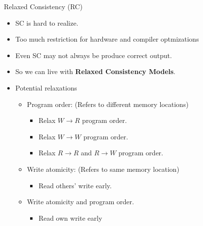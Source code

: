 \documentclass[9pt]{beamer}
\begin{document}
\begin{frame}{Relaxed Consistency (RC)}
\begin{itemize}
\item SC is hard to realize.
\item Too much restriction for hardware and compiler optmizations
\item Even SC may not always be produce correct output.
\item So we can live with \textbf{Relaxed Consistency Models}.
\pause
\item Potential relaxations~\cite{rajeev-utah}
  \begin{itemize}
  \item Program order: (Refers to different memory locations)
    \begin{itemize}
    \item Relax $W \rightarrow R$ program order.
    \item Relax $W \rightarrow W$ program order.
    \item Relax $R \rightarrow R$ and $R \rightarrow W$ program order.
    \end{itemize}
\pause
  \item Write atomicity: (Refers to same memory location)
    \begin{itemize}
    \item Read others' write early.
    \end{itemize}
\pause
  \item Write atomicity and program order.
    \begin{itemize}
    \item Read own write early
    \end{itemize}
  \end{itemize}
\end{itemize}
\end{frame}
\end{document}
